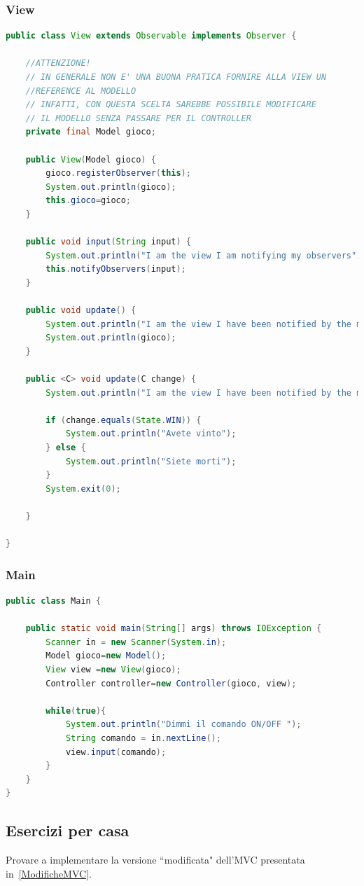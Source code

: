 \documentclass{article}
\begin{document}
\subsubsection{View}
\begin{lstlisting}[language=Java]
public class View extends Observable implements Observer {

    //ATTENZIONE!
    // IN GENERALE NON E' UNA BUONA PRATICA FORNIRE ALLA VIEW UN 
    //REFERENCE AL MODELLO 
    // INFATTI, CON QUESTA SCELTA SAREBBE POSSIBILE MODIFICARE
    // IL MODELLO SENZA PASSARE PER IL CONTROLLER
	private final Model gioco;
	
	public View(Model gioco) {
		gioco.registerObserver(this);
		System.out.println(gioco);
		this.gioco=gioco;
	}

	public void input(String input) {
		System.out.println("I am the view I am notifying my observers");
		this.notifyObservers(input);
	}

	public void update() {
		System.out.println("I am the view I have been notified by the model ");
		System.out.println(gioco);
	}

	public <C> void update(C change) {
		System.out.println("I am the view I have been notified by the model with an update C");
		
		if (change.equals(State.WIN)) {
			System.out.println("Avete vinto");
		} else {
			System.out.println("Siete morti");
		}
		System.exit(0);

	}

}
\end{lstlisting}

\subsubsection{Main}
\begin{lstlisting}[language=Java]
public class Main {

	public static void main(String[] args) throws IOException {
		Scanner in = new Scanner(System.in);
		Model gioco=new Model();
		View view =new View(gioco);
		Controller controller=new Controller(gioco, view);
		
		while(true){
			System.out.println("Dimmi il comando ON/OFF ");
			String comando = in.nextLine();
			view.input(comando);
		}
	}
}
\end{lstlisting}

\subsection{Esercizi per casa}
Provare a implementare la versione ``modificata" dell'MVC presentata in~\ref{ModificheMVC}.
\end{document}
